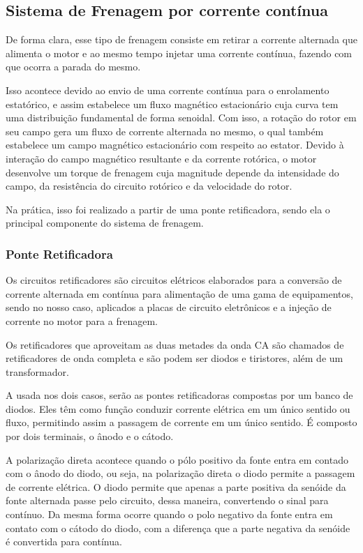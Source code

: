 \subsection{Sistema de Frenagem por corrente contínua}
De forma clara, esse tipo de frenagem consiste em retirar a corrente alternada que alimenta o motor e ao mesmo tempo injetar uma corrente contínua, fazendo com que ocorra a parada do mesmo. 

Isso acontece devido ao envio de uma corrente contínua para o enrolamento estatórico, e assim estabelece um fluxo magnético estacionário cuja curva tem uma distribuição fundamental de forma senoidal. Com isso, a rotação do rotor em seu campo gera um fluxo de corrente alternada no mesmo, o qual também estabelece um campo magnético estacionário com respeito ao estator. Devido à interação do campo magnético resultante e da corrente rotórica, o motor desenvolve um torque de frenagem cuja magnitude depende da intensidade do campo, da resistência do circuito rotórico e da velocidade do rotor.

Na prática, isso foi realizado a partir de uma ponte retificadora, sendo ela o principal componente do sistema de frenagem.

\subsubsection{Ponte Retificadora}
Os circuitos retificadores são circuitos elétricos elaborados para a conversão de corrente alternada em contínua para alimentação de uma gama de equipamentos, sendo no nosso caso, aplicados a placas de circuito eletrônicos e a injeção de corrente no motor para a frenagem. 

Os retificadores que aproveitam as duas metades da onda CA são chamados de retificadores de onda completa e são podem ser diodos e tiristores, além de um transformador.

A usada nos dois casos, serão as pontes retificadoras compostas por um banco de diodos. Eles têm como função conduzir corrente elétrica em um único sentido ou fluxo, permitindo assim a passagem de corrente em um único sentido. É composto por dois terminais, o ânodo e o cátodo. 

A polarização direta acontece quando o pólo positivo da fonte entra em contado com o ânodo do diodo, ou seja, na polarização direta o diodo permite a passagem de corrente elétrica. O diodo permite que apenas a parte positiva da senóide da fonte alternada passe pelo circuito, dessa maneira, convertendo o sinal para contínuo. Da mesma forma ocorre quando o polo negativo da fonte entra em contato com o cátodo do diodo, com a diferença que a parte negativa da senóide é convertida para contínua.

